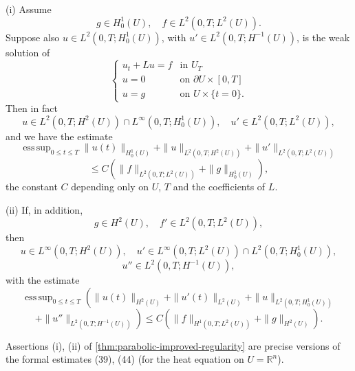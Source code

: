 \begin{theorem}
\label{thm:parabolic-improved-regularity}
(i) Assume
\[
g \in H_0^1(U), \quad f \in L^2(0,T; L^2(U)).
\]
Suppose also $u \in L^2(0,T; H_0^1(U))$, with $u' \in L^2(0,T; H^{-1}(U))$, is the weak solution of
\[
\begin{cases}
u_t + Lu = f & \text{in } U_T \\
u = 0 & \text{on } \partial U \times [0,T] \\
u = g & \text{on } U \times \{t = 0\}.
\end{cases}
\]
Then in fact
\[
u \in L^2(0,T; H^2(U)) \cap L^\infty(0,T; H_0^1(U)), \quad u' \in L^2(0,T; L^2(U)),
\]
and we have the estimate
\[
\operatorname{ess\,sup}_{0 \leq t \leq T} \|u(t)\|_{H_0^1(U)} + \|u\|_{L^2(0,T; H^2(U))} + \|u'\|_{L^2(0,T; L^2(U))}
\]
\[
\leq C \left( \|f\|_{L^2(0,T; L^2(U))} + \|g\|_{H_0^1(U)} \right),
\tag{46}
\]
the constant $C$ depending only on $U$, $T$ and the coefficients of $L$.

(ii) If, in addition,
\[
g \in H^2(U), \quad f' \in L^2(0,T;L^2(U)),
\]
then
\[
u \in L^\infty(0,T;H^2(U)), \quad u' \in L^\infty(0,T;L^2(U)) \cap L^2(0,T;H_0^1(U)),
\]
\[
u'' \in L^2(0,T;H^{-1}(U)),
\]
with the estimate
\[
\operatorname{ess\,sup}_{0 \leq t \leq T} \left( \|u(t)\|_{H^2(U)} + \|u'(t)\|_{L^2(U)} + \|u\|_{L^2(0,T;H_0^1(U))} \right.
\]
\[
\left. + \|u''\|_{L^2(0,T;H^{-1}(U))} \right) \leq C \left( \|f\|_{H^1(0,T;L^2(U))} + \|g\|_{H^2(U)} \right).
\tag{47}
\]
\end{theorem}

\begin{remark}
\label{rem:parabolic-improved-regularity-remark}
Assertions (i), (ii) of \cref{thm:parabolic-improved-regularity} are precise versions of the formal estimates (39), (44) (for the heat equation on $U = \mathbb{R}^n$).
\end{remark}

